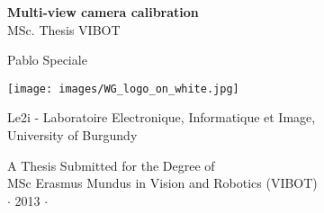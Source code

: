 
\newpage
\thispagestyle{empty}


\vspace*{1cm}
\begin{center}
\huge{\bf Multi-view camera calibration} \\[0.5cm]
{\Large MSc. Thesis VIBOT\\} \vspace{2cm} {\large
Pablo Speciale\\
\vspace{1cm}

\texttt{[image: images/WG\_logo\_on\_white.jpg]}
}
\end{center}

\vspace{1cm}
\begin{center}
\normalsize{
Le2i - Laboratoire Electronique, Informatique et Image, \\
University of Burgundy}
\end{center}



\vspace{3.5cm}
\begin{center}
{\large A Thesis Submitted for the Degree of \\MSc Erasmus Mundus
in Vision and Robotics (VIBOT) \\\vspace{0.3cm} $\cdot$ 2013
$\cdot$}
\end{center}
\singlespacing









